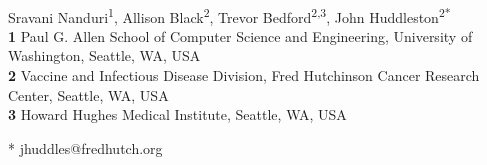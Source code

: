 \documentclass[10pt,letterpaper]{article}
\begin{document}
\vspace*{0.2in}

\begin{flushleft}
{\Large
\textbf{} %
}
\newline
\\
Sravani Nanduri\textsuperscript{1},
Allison Black\textsuperscript{2},
Trevor Bedford\textsuperscript{2,3},
John Huddleston\textsuperscript{2*}
\\
\bigskip
\textbf{1} Paul G. Allen School of Computer Science and Engineering, University of Washington, Seattle, WA, USA
\\
\textbf{2} Vaccine and Infectious Disease Division, Fred Hutchinson Cancer Research Center, Seattle, WA, USA
\\
\textbf{3} Howard Hughes Medical Institute, Seattle, WA, USA
\\
\bigskip

%
%





* jhuddles@fredhutch.org

\end{flushleft}
\end{document}
